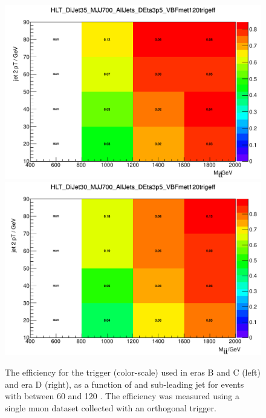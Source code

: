 \begin{figure} 
  \includegraphics[width=.6\largefigwidth]{plots/parked/HLT_DiJet35_MJJ700_AllJets_DEta3p5_VBFmet120trigeff.pdf}
  \includegraphics[width=.6\largefigwidth]{plots/parked/HLT_DiJet30_MJJ700_AllJets_DEta3p5_VBFmet120trigeff.pdf}
 \caption{The efficiency for the trigger (color-scale) used in eras B and C (left) and era D (right), as a function of \Mjj and sub-leading jet \pt for events with \METnoMU between 60 and 120 \GeV. The efficiency was measured using a single muon dataset collected with an orthogonal trigger.}
  \label{fig:parked3dtrigeff}
\end{figure}

